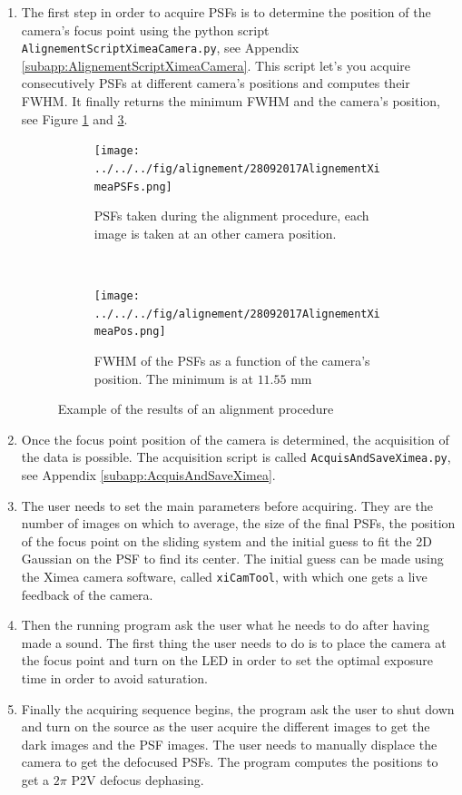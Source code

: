 \begin{enumerate}

\item The first step in order to acquire PSFs is to determine the position of the camera's focus point using the python script \verb|AlignementScriptXimeaCamera.py|, see Appendix \ref{subapp:AlignementScriptXimeaCamera}. This script let's you acquire consecutively PSFs at different camera's positions and computes their FWHM. It finally returns the minimum FWHM and the camera's position, see Figure \ref{subfig:28092017AlignementXimeaPSFs} and \ref{subfig:28092017AlignementXimeaPos}.

\begin{figure}
\centering
    \begin{subfigure}{\textwidth}
        \texttt{[image: ../../../fig/alignement/28092017AlignementXimeaPSFs.png]}
        \caption{PSFs taken during the alignment procedure, each image is taken at an other camera position.}
        \label{subfig:28092017AlignementXimeaPSFs}
    \end{subfigure}
    \\
    \begin{subfigure}{0.6\textwidth}
        \texttt{[image: ../../../fig/alignement/28092017AlignementXimeaPos.png]}
        \caption{FWHM of the PSFs as a function of the camera's position. The minimum is at $11.55$ mm}
        \label{subfig:28092017AlignementXimeaPos}
    \end{subfigure}
    \decoRule
    \caption{Example of the results of an alignment procedure}
\end{figure}

\item Once the focus point position of the camera is determined, the acquisition of the data is possible. The acquisition script is called \verb!AcquisAndSaveXimea.py!, see Appendix \ref{subapp:AcquisAndSaveXimea}.

\item The user needs to set the main parameters before acquiring. They are the number of images on which to average, the size of the final PSFs, the position of the focus point on the sliding system and the initial guess to fit the 2D Gaussian on the PSF to find its center. The initial guess can be made using the Ximea camera software, called \verb!xiCamTool!, with which one gets a live feedback of the camera.

\item Then the running program ask the user what he needs to do after having made a sound. The first thing the user needs to do is to place the camera at the focus point and turn on the LED in order to set the optimal exposure time in order to avoid saturation.

\item Finally the acquiring sequence begins, the program ask the user to shut down and turn on the source as the user acquire the different images to get the dark images and the PSF images. The user needs to manually displace the camera to get the defocused PSFs. The program computes the positions to get a $2\pi$ P2V defocus dephasing.

\end{enumerate}


